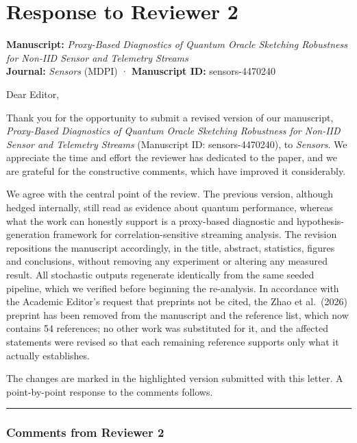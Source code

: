 \documentclass[
  11pt,
]{article}
\author{}
\date{}
\begin{document}
\section{Response to Reviewer 2}\label{response-to-reviewer-2}

\textbf{Manuscript:} \emph{Proxy-Based Diagnostics of Quantum Oracle
Sketching Robustness for Non-IID Sensor and Telemetry Streams}\\
\textbf{Journal:} \emph{Sensors} (MDPI) · \textbf{Manuscript ID:}
sensors-4470240

Dear Editor,

Thank you for the opportunity to submit a revised version of our
manuscript, \emph{Proxy-Based Diagnostics of Quantum Oracle Sketching
Robustness for Non-IID Sensor and Telemetry Streams} (Manuscript ID:
sensors-4470240), to \emph{Sensors}. We appreciate the time and effort
the reviewer has dedicated to the paper, and we are grateful for the
constructive comments, which have improved it considerably.

We agree with the central point of the review. The previous version,
although hedged internally, still read as evidence about quantum
performance, whereas what the work can honestly support is a proxy-based
diagnostic and hypothesis-generation framework for correlation-sensitive
streaming analysis. The revision repositions the manuscript accordingly,
in the title, abstract, statistics, figures and conclusions, without
removing any experiment or altering any measured result. All stochastic
outputs regenerate identically from the same seeded pipeline, which we
verified before beginning the re-analysis. In accordance with the
Academic Editor's request that preprints not be cited, the Zhao et
al.~(2026) preprint has been removed from the manuscript and the
reference list, which now contains 54 references; no other work was
substituted for it, and the affected statements were revised so that
each remaining reference supports only what it actually establishes.

The changes are marked in the highlighted version submitted with this
letter. A point-by-point response to the comments follows.

\begin{center}\rule{0.5\linewidth}{0.5pt}\end{center}

\subsubsection{Comments from Reviewer 2}\label{comments-from-reviewer-2}
\end{document}
